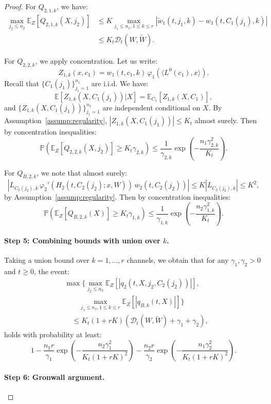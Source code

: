 \documentclass[nohyperref]{article}
\theoremstyle{plain}
\theoremstyle{definition}
\theoremstyle{remark}
\begin{document}
\begin{proof}
For $Q_{2,1,k}$, we have:
\begin{align*}
\max_{j_2 \le n_2}\mathbb{E}_Z[Q_{2,1,k}(X, j_2)] &\le K\max_{j_1 \le n_1, 1 \le k \le r}|\tilde{w}_1(t, j_1, k) - w_1(t, C_1(j_1), k)|\\
&\le K_t\mathscr{D}_t(W, \tilde{W}).
\end{align*}

For $Q_{2,2,k}$, we apply concentration. Let us write:
\[
Z_{1,k}(x, c_1) = w_1(t, c_1, k)\,\varphi_1(\langle L^0(c_1), x\rangle).
\]
Recall that $\{C_1(j_1)\}_{j_1=1}^{n_1}$ are i.i.d. We have:
\[
\mathbb{E}[Z_{1,k}(X, C_1(j_1))|X] = \mathbb{E}_{C_1}[Z_{1,k}(X, C_1)],
\]
and $\{Z_{1,k}(X, C_1(j_1))\}_{j_1=1}^{n_1}$ are independent conditional on $X$. By Assumption~\ref{assump:regularity}, $|Z_{1,k}(X, C_1(j_1))| \le K_t$ almost surely. Then by concentration inequalities:
\[
\mathbb{P}\left(\mathbb{E}_Z[Q_{2,2,k}(X, j_2)] \ge K_t\gamma_{2,k}\right) \le \frac{1}{\gamma_{2,k}}\exp\left(-\frac{n_1\gamma_{2,k}^2}{K_t}\right).
\]

For $Q_{B,2,k}$, we note that almost surely:
\[
|L_{C_2(j_2),k}\,\varphi_2'(H_2(t, C_2(j_2); x, W))\,w_2(t, C_2(j_2))| \le K|L_{C_2(j_2),k}| \le K^2,
\]
by Assumption~\ref{assump:regularity}. Then by concentration inequalities:
\[
\mathbb{P}\left(\mathbb{E}_Z[Q_{B,2,k}(X)] \ge K_t\gamma_{1,k}\right) \le \frac{1}{\gamma_{1,k}}\exp\left(-\frac{n_2\gamma_{1,k}^2}{K_t}\right).
\]

\paragraph*{Step 5: Combining bounds with union over $k$.}

Taking a union bound over $k = 1, \ldots, r$ channels, we obtain that for any $\gamma_1, \gamma_2 > 0$ and $t \ge 0$, the event:
\begin{align*}
&\max\Bigg\{\max_{j_2 \le n_2}\mathbb{E}_Z[|q_2(t, X, j_2, C_2(j_2))|],\\
&\qquad\max_{j_1 \le n_1, 1 \le k \le r}\mathbb{E}_Z[|q_{B,k}(t, X)|]\Bigg\}\\
&\quad \le K_t(1+rK)(\mathscr{D}_t(W, \tilde{W}) + \gamma_1 + \gamma_2),
\end{align*}
holds with probability at least:
\[
1 - \frac{n_1r}{\gamma_1}\exp\left(-\frac{n_2\gamma_1^2}{K_t(1+rK)^2}\right) - \frac{n_2r}{\gamma_2}\exp\left(-\frac{n_1\gamma_2^2}{K_t(1+rK)^2}\right).
\]

\paragraph*{Step 6: Gronwall argument.}


\end{proof}
\end{document}
